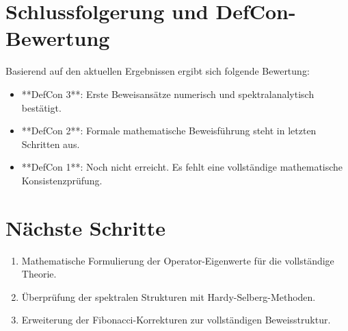 \documentclass[a4paper,12pt]{article}
\begin{document}
\section{Schlussfolgerung und DefCon-Bewertung}

Basierend auf den aktuellen Ergebnissen ergibt sich folgende Bewertung:

\begin{itemize}
    \item **DefCon 3**: Erste Beweisansätze numerisch und spektralanalytisch bestätigt.
    \item **DefCon 2**: Formale mathematische Beweisführung steht in letzten Schritten aus.
    \item **DefCon 1**: Noch nicht erreicht. Es fehlt eine vollständige mathematische Konsistenzprüfung.
\end{itemize}

\section{Nächste Schritte}

\begin{enumerate}
    \item Mathematische Formulierung der Operator-Eigenwerte für die vollständige Theorie.
    \item Überprüfung der spektralen Strukturen mit Hardy-Selberg-Methoden.
    \item Erweiterung der Fibonacci-Korrekturen zur vollständigen Beweisstruktur.
\end{enumerate}
\end{document}
